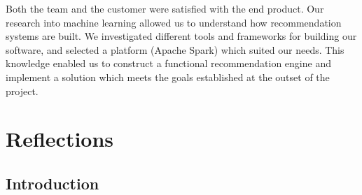 \documentclass{l3proj}
\begin{document}
Both the team and the customer were satisfied with the end product. Our research into machine learning allowed us to understand how recommendation systems are built. We investigated different tools and frameworks for building our software, and selected a platform (Apache Spark) which suited our needs. This knowledge enabled us to construct a functional recommendation engine and implement a solution which meets the goals established at the outset of the project. 


\section{Reflections}
\label{sec:reflections}



\subsection{Introduction}
\label{sec:leadreflection}
\end{document}
